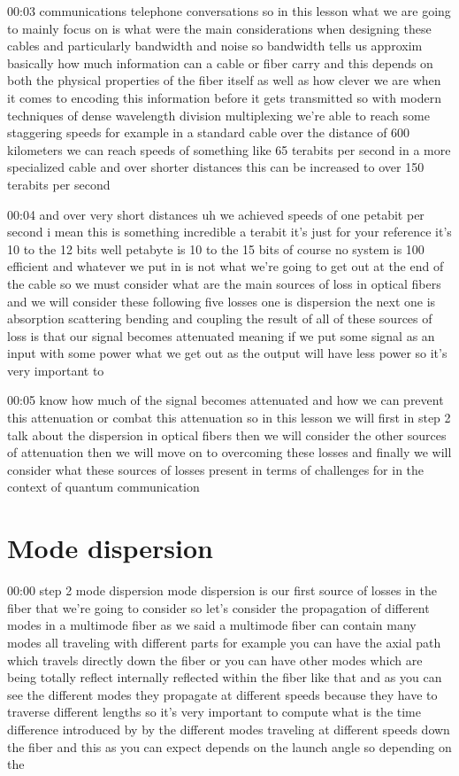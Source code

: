 00:03
communications telephone conversations so in this lesson what we are going to
mainly focus on is what were the main considerations when designing these cables
and particularly bandwidth and noise so bandwidth tells us approxim basically
how much information can a cable or fiber carry and this depends on both the
physical properties of the fiber itself as well as how
clever we are when it comes to encoding this
information before it gets transmitted so with modern techniques of dense
wavelength division multiplexing we're able to reach some staggering speeds
for example in a standard cable over the distance of
600 kilometers we can reach speeds of something like 65 terabits per second
in a more specialized cable and over shorter distances
this can be increased to over 150 terabits per second

00:04
and over very short distances uh we achieved speeds of one
petabit per second i mean this is something incredible a terabit it's just
for your reference it's 10 to the 12 bits well petabyte is 10 to the 15 bits
of course no system is 100 efficient and whatever we put in is not
what we're going to get out at the end of the
cable so we must consider what are the main sources of loss in optical fibers
and we will consider these following five losses
one is dispersion the next one is absorption scattering bending and coupling
the result of all of these sources of loss is that our signal becomes attenuated
meaning if we put some signal as an input with some power
what we get out as the output will have less power so it's very important to

00:05
know how much of the signal becomes attenuated and how we can
prevent this attenuation or combat this attenuation
so in this lesson we will first in step 2 talk about the dispersion in optical
fibers then we will consider the other sources of attenuation
then we will move on to overcoming these losses
and finally we will consider what these sources of losses present
in terms of challenges for in the context of quantum communication

\section{Mode dispersion}

00:00
step 2 mode dispersion mode dispersion is our first source of
losses in the fiber that we're going to consider
so let's consider the propagation of different modes
in a multimode fiber as we said a multimode fiber can contain many modes
all traveling with different parts for example you can have the axial path
which travels directly down the fiber or you can have other
modes which are being totally reflect internally reflected within the fiber
like that and as you can see the different modes
they propagate at different speeds because they have to traverse
different lengths so it's very important to compute what is the time difference
introduced by by the different modes traveling at different speeds down the
fiber and this as you can expect depends on the launch angle so depending on the

